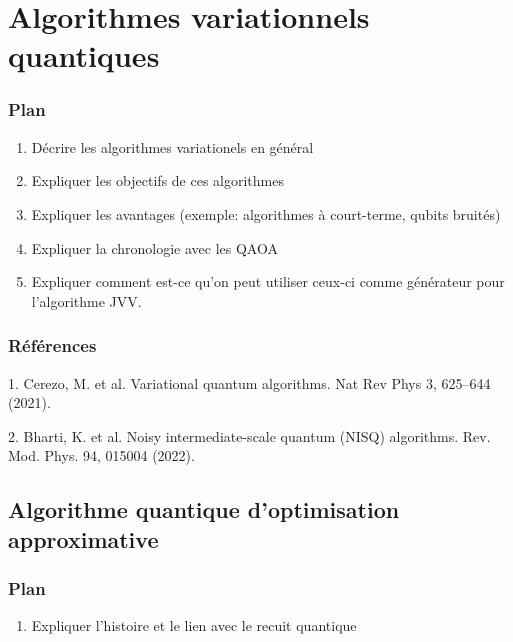 \begin{comment}
\end{comment}

\chapter{Algorithmes variationnels quantiques}


\subsection*{Plan}

\begin{enumerate}
    \item Décrire les algorithmes variationels en général
    \item Expliquer les objectifs de ces algorithmes
    \item Expliquer les avantages (exemple: algorithmes à court-terme, qubits bruités)
    \item Expliquer la chronologie avec les QAOA
    \item Expliquer comment est-ce qu'on peut utiliser ceux-ci comme générateur pour l'algorithme JVV.
\end{enumerate}
    
\subsection*{Références}

1. Cerezo, M. et al. Variational quantum algorithms. Nat Rev Phys 3, 625–644 (2021).

2. Bharti, K. et al. Noisy intermediate-scale quantum (NISQ) algorithms. Rev. Mod. Phys. 94, 015004 (2022).


\section{Algorithme quantique d'optimisation approximative}

\subsection*{Plan}

\begin{enumerate}
    \item Expliquer l'histoire et le lien avec le recuit quantique 
\end{enumerate}


